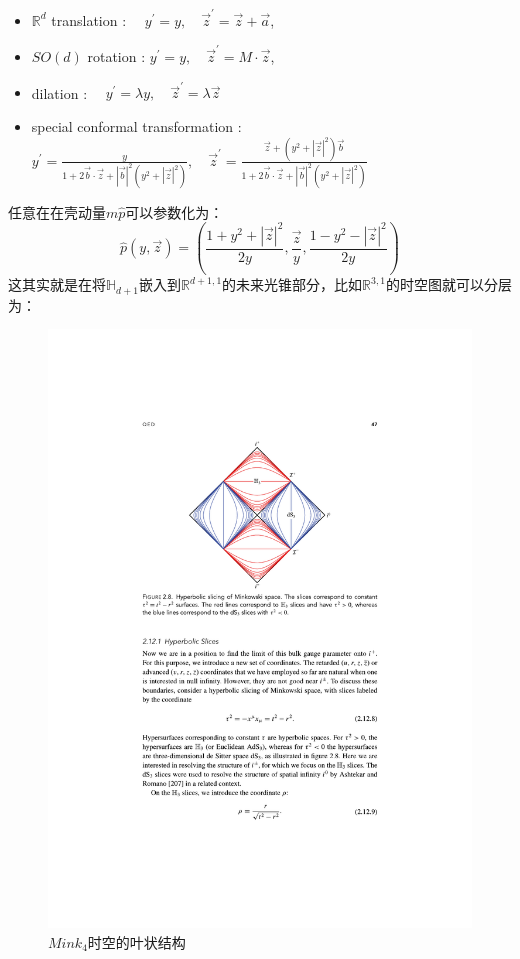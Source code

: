 \begin{itemize}
	\item $\mathbb{R}^d$ translation : $\quad y^{\prime}=y, \quad \vec{z}^{\prime}=\vec{z}+\vec{a}$,\\
	\item $S O(d)$ rotation : $y^{\prime}=y, \quad \vec{z}^{\prime}=M \cdot \vec{z}$,\\
	\item dilation : $\quad y^{\prime}=\lambda y, \quad \vec{z}^{\prime}=\lambda \vec{z}$\\
	\item special conformal transformation : $y^{\prime}=\frac{y}{1+2 \vec{b} \cdot \vec{z}+|\vec{b}|^2\left(y^2+|\vec{z}|^2\right)}, \quad \vec{z}^{\prime}=\frac{\vec{z}+\left(y^2+|\vec{z}|^2\right) \vec{b}}{1+2 \vec{b} \cdot \vec{z}+|\vec{b}|^2\left(y^2+|\vec{z}|^2\right)}$
\end{itemize}
任意在在壳动量$m\hat p$可以参数化为：
\begin{equation}
	\hat{p}(y,\vec{z})=\left(\frac{1+y^2+|\vec{z}|^2}{2y},\frac{\vec{z}}{y},\frac{1-y^2-|\vec{z}|^2}{2y}\right)
\end{equation}
这其实就是在将$\mathbb{H}_{d+1}$嵌入到$\mathbb{R}^{d+1,1}$的未来光锥部分，比如$\mathbb{R}^{3,1}$的时空图就可以分层为：
\begin{figure}[H]
	\centering 
	\includegraphics{figs/fig6.pdf}
	\caption{$Mink_4$时空的叶状结构}
	\label{fig:Mink4}
\end{figure}
